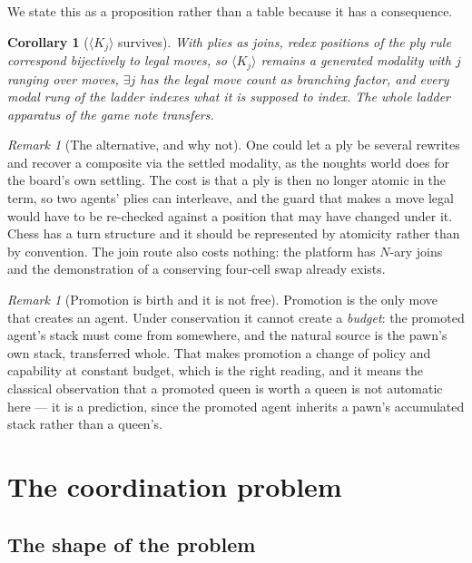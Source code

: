 \documentclass[11pt,a4paper]{article}
\theoremstyle{plain}
\newtheorem{corollary}[theorem]{Corollary}
\theoremstyle{definition}
\theoremstyle{remark}
\newtheorem{remark}[theorem]{Remark}
\newcommand{\Kmod}[1]{\langle K_{#1}\rangle}
\begin{document}
We state this as a proposition rather than a table because it has a consequence.

\begin{corollary}[$\Kmod{j}$ survives]
\label{cor:Ksurvives}
With plies as joins, redex positions of the ply rule correspond bijectively to
legal moves, so $\Kmod{j}$ remains a generated modality with $j$ ranging over
moves, $\exists j$ has the legal move count as branching factor, and every modal
rung of the ladder indexes what it is supposed to index. The whole ladder
apparatus of the game note transfers.
\end{corollary}

\begin{remark}[The alternative, and why not]
\label{rem:alt}
One could let a ply be several rewrites and recover a composite via the settled
modality, as the noughts world does for the board's own settling. The cost is
that a ply is then no longer atomic in the term, so two agents' plies can
interleave, and the guard that makes a move legal would have to be re-checked
against a position that may have changed under it. Chess has a turn structure
and it should be represented by atomicity rather than by convention. The join
route also costs nothing: the platform has $N$-ary joins and the demonstration
of a conserving four-cell swap already exists.
\end{remark}

\begin{remark}[Promotion is birth and it is not free]
\label{rem:promo}
Promotion is the only move that creates an agent. Under conservation it cannot
create a \emph{budget}: the promoted agent's stack must come from somewhere, and
the natural source is the pawn's own stack, transferred whole. That makes
promotion a change of policy and capability at constant budget, which is the
right reading, and it means the classical observation that a promoted queen is
worth a queen is not automatic here --- it is a prediction, since the promoted
agent inherits a pawn's accumulated stack rather than a queen's.
\end{remark}

\section{The coordination problem}
\label{sec:coord}

\subsection{The shape of the problem}
\end{document}

